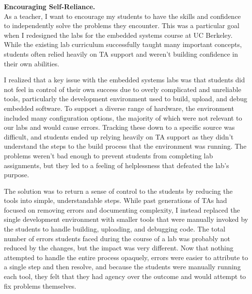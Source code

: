 \documentclass[11pt]{article} %
\begin{document}
\bigskip
\textbf{\textsf{\large Encouraging Self-Reliance.}}\\
As a teacher, I want to encourage my students to have the skills and confidence
to independently solve the problems they encounter.
%
This was a particular goal when I redesigned the labs for the embedded systems
course at UC Berkeley.
%
While the existing lab curriculum successfully taught many important concepts,
students often relied heavily on TA support and weren't building confidence in
their own abilities.

I realized that a key issue with the embedded systems labs was that students
did not feel in control of their own success due to overly complicated and
unreliable tools, particularly the development environment used to build,
upload, and debug embedded software. To support a diverse range of hardware,
the environment included many configuration options, the majority of which were
not relevant to our labs and would cause errors. Tracking these down to a
specific source was difficult, and students ended up relying heavily on TA
support as they didn't understand the steps to the build process that the
environment was running. The problems weren't bad enough to prevent students
from completing lab assignments, but they led to a feeling of helplessness
that defeated the lab's purpose.

The solution was to return a sense of control to the students by
reducing the tools into simple, understandable steps. While past generations of
TAs had focused on removing errors and documenting complexity, I instead
replaced the single development environment with smaller tools that were
manually invoked by the students to handle building, uploading, and debugging
code. The total number of errors students faced during the course of a lab was
probably not reduced by the changes, but the impact was very different. Now
that nothing attempted to handle the entire process opaquely, errors were
easier to attribute to a single step and then resolve, and because the students
were manually running each tool, they felt that they had agency over the
outcome and would attempt to fix problems themselves.
\end{document}
